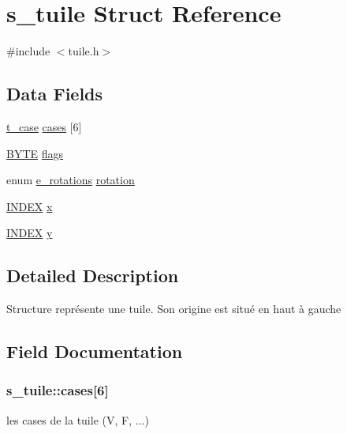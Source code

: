 \hypertarget{structs__tuile}{}\section{s\+\_\+tuile Struct Reference}
\label{structs__tuile}


{\ttfamily \#include $<$tuile.\+h$>$}

\subsection*{Data Fields}
\begin{DoxyCompactItemize}
\item 
\hyperlink{structs__case}{t\+\_\+case} \hyperlink{structs__tuile_a515d803b97133bba6f803605801f45cb}{cases} \mbox{[}6\mbox{]}
\item 
\hyperlink{types_8h_aec93e83855ac17c3c25c55c37ca186dd}{B\+Y\+TE} \hyperlink{structs__tuile_a5d69c62cf0466ef19df55fbdb855d72d}{flags}
\item 
enum \hyperlink{tuile_8h_a1fe4cded84ddee1e53a7d351ee0ef77f}{e\+\_\+rotations} \hyperlink{structs__tuile_a750c160d0579f887c8a1cd69b562a5c5}{rotation}
\item 
\hyperlink{types_8h_ac6885dbfb371c33e523c7fb046118b36}{I\+N\+D\+EX} \hyperlink{structs__tuile_ae907b0e7060b9bba022b58b33865fe99}{x}
\item 
\hyperlink{types_8h_ac6885dbfb371c33e523c7fb046118b36}{I\+N\+D\+EX} \hyperlink{structs__tuile_a0f1e6c057219c80008d690c809d75258}{y}
\end{DoxyCompactItemize}


\subsection{Detailed Description}
Structure représente une tuile. Son origine est situé \textquotesingle{}en haut à gauche\textquotesingle{} 

\subsection{Field Documentation}
\subsubsection[{\texorpdfstring{cases}{cases}}]{ s\+\_\+tuile\+::cases\mbox{[}6\mbox{]}}\hypertarget{structs__tuile_a515d803b97133bba6f803605801f45cb}{}\label{structs__tuile_a515d803b97133bba6f803605801f45cb}
les cases de la tuile (\textquotesingle{}V\textquotesingle{}, \textquotesingle{}F\textquotesingle{}, ...) 
